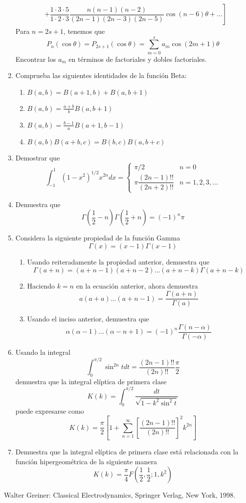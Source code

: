 \begin{enumerate}
\[\begin{split}
&+ \left. \dfrac{1 \cdot 3 \cdot 5}{1 \cdot 2 \cdot 3} \dfrac{n(n-1)(n-2)}{(2n-1)(2n-3)(2n-5)} \cos(n-6) \theta + \ldots \right]
\end{split}
\]
Para $n=2s+1$, tenemos que
\[ P_{n}(\cos \theta) =  P_{2s+1} (\cos \theta) =  \sum_{m=0}^{s} a_{m} \cos(2m+1) \theta \]
Encontrar los $a_{m}$ en términos de factoriales y dobles factoriales.
\item Comprueba las siguientes identidades de la función Beta:
\begin{enumerate}
\item $B(a,b) = B(a+1,b) + B(a,b+1)$
\item $B(a,b) = \frac{a+b}{b} B(a,b+1)$ 
\item $B(a,b) = \frac{b-1}{a} B(a+1,b-1)$
\item $B(a,b) B(a+b,c) = B(b,c) B(a,b+c)$
\end{enumerate}
\item Demostrar que
\[ \int_{-1}^{1} (1-x^{2})^{1/2} x^{2n} dx =  
\begin{cases}
\pi/2 & n = 0 \\
\pi \dfrac{(2n-1)!!}{(2n+2)!!} & n=1,2,3,\ldots  \end{cases}
 \]
\item Demuestra que 
\[ \Gamma(\frac{1}{2} - n) \Gamma(\frac{1}{2} + n) = (-1)^{n} \pi \]
\item Considera la siguiente propiedad de la función Gamma
\[ \Gamma(x) = (x-1) \Gamma (x-1) \]
\begin{enumerate}[label=\alph{*})]
\item Usando reiteradamente la propiedad anterior, demuestra que
\[ \Gamma(a+n) = (a+n-1)(a+n-2) \ldots (a+n-k) \Gamma(a+n-k) \]
\item Haciendo $k=n$ en la ecuación anterior, ahora demuestra
\[ a(a+a) \ldots (a+n-1) = \dfrac{\Gamma(a+n)}{\Gamma(a)} \]
\item Usando el inciso anterior, demuestra que
\[ \alpha (\alpha-1) \ldots (\alpha -n + 1) = (-1)^{n} \dfrac{\Gamma(n-\alpha)}{\Gamma(-\alpha)} \]
\end{enumerate}
\item Usando la integral 
\[ \int_{0}^{\pi/2} \sin^{2n} t dt = \dfrac{(2n-1)!!}{(2n)!!} \dfrac{\pi}{2} \]
demuestra que la integral elíptica de primera clase
\[ K(k) = \int_{0}^{\pi/2} \dfrac{dt}{\sqrt{1-k^{2} \sin^{2}t}} \]
puede expresarse como
\[ K(k) = \dfrac{\pi}{2} \left[ 1 + \sum_{n=1}^{\infty} \left[ \dfrac{(2n-1)!!}{(2n)!!} \right]^{2} k^{2n} \right]  \]
\item Demuestra que la integral elíptica de primera clase está relacionada con la función hipergeométrica de la siguiente manera
\[ K(k) = \dfrac{\pi}{4} F \left( \dfrac{1}{2}, \dfrac{1}{2};1,k^{2} \right) \]
\end{enumerate}
\begin{thebibliography}{99}
 Walter Greiner: Classical Electrodynamics, Springer Verlag, New York, 1998.
\end{thebibliography}
